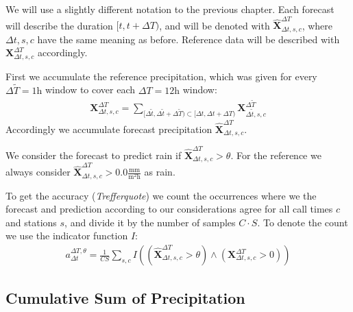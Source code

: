 \documentclass{article}
\theoremstyle{plain}
\theoremstyle{definition}
\theoremstyle{remark}
\begin{document}
We will use a slightly different notation to the previous chapter.
Each forecast will describe the duration $[t, t+ \Delta T)$, and will be
denoted with $\hat{\textbf{X}}_{\Delta t, s, c}^{\Delta T}$, where $\Delta t,
    s, c$ have the same meaning as before. Reference data will be described with
$\textbf{X}_{\Delta t, s, c}^{\Delta T}$ accordingly.

First we accumulate the reference precipitation, which was given for every
$\Delta \tilde{T} = 1 \text{h}$ window to cover each $\Delta T = 12\text{h}$
window:
\begin{align}
    \textbf{X}_{\Delta t, s, c}^{\Delta T} = \sum_{[\Delta \tilde{t}, \Delta
    \tilde{t} + \Delta \tilde{T}) \subset [\Delta t, \Delta t + \Delta T)}
    \textbf{X}_{\Delta \tilde{t}, s, c}^{\Delta \tilde{T}}
\end{align}
Accordingly we accumulate forecast precipitation $\hat{\textbf{X}}_{\Delta t,
        s, c}^{\Delta T}$.

We consider the forecast to predict rain if $\hat{\textbf{X}}_{\Delta t, s,
        c}^{\Delta T} > \theta$.
For the reference we always consider $\hat{\textbf{X}}_{\Delta t, s, c}^{\Delta
        T} > 0.0 \frac{\text{mm}}{\text{m}^2 \text{h}}$ as rain.

To get the accuracy (\textit{Trefferquote}) we count the occurrences where we
the forecast and prediction according to our considerations agree for all call
times $c$ and stations $s$, and divide it by the number of samples $C \cdot S$.
To denote the count we use the indicator function $I$:
\begin{align}
    a^{\Delta T, \theta}_{\Delta t} = \frac{1}{C S} \sum_{s,c}
    I\left(\left(\hat{\textbf{X}}_{\Delta t, s, c}^{\Delta T} > \theta\right) \land
    \left(\textbf{X}_{\Delta t, s, c}^{\Delta T} > 0\right)\right)
\end{align}

\subsection{Cumulative Sum of Precipitation}
\end{document}
